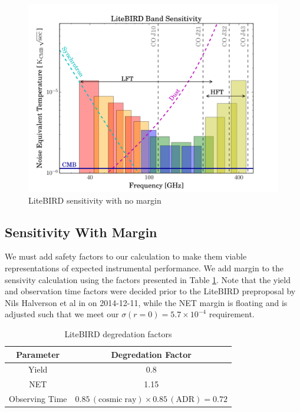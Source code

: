 \documentclass[12pt, titlepage]{article} %
\begin{document}
\begin{figure}[H]
	\includegraphics[width=1.1\textwidth, center]{PDF/LBSensitivity_noMargin.pdf}
	\caption{LiteBIRD sensitivity with no margin \label{fig:sens}}
\end{figure}


\subsection{Sensitivity With Margin}

We must add safety factors to our calculation to make them viable representations of expected instrumental performance. We add margin to the sensivity calculation using the factors presented in Table \ref{table:degFactors}. Note that the yield and observation time factors were decided prior to the LiteBIRD preproposal by Nils Halverson et al in on 2014-12-11, while the NET margin is floating and is adjusted such that we meet our $\sigma(r=0) = 5.7 \times 10^{-4}$ requirement.

\begin{table}[H]
\centering
	\begin{tabular}{|| c | c ||}
	\hline
	Parameter & Degredation Factor\\
	\hline
	\hline
	Yield & 0.8 \\
	\hline
	NET & 1.15 \\
	\hline
	Observing Time & $\mathrm{0.85 \, (cosmic \; ray) \times 0.85 \, (ADR) = 0.72}$ \\
	\hline
	\end{tabular}
\caption{LiteBIRD degredation factors \label{table:degFactors}}
\end{table}
\end{document}
